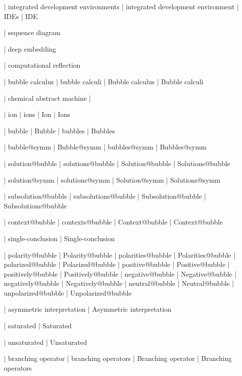 
 | integrated development environments
 | integrated development environment
 | IDEs
 | IDE

 | sequence diagram

 | deep embedding

 | computational reflection


 | bubble calculus
 | bubble calculi
 | Bubble calculus
 | Bubble calculi

 | chemical abstract machine
 | \cham
 
 | ion
 | ions
 | Ion
 | Ions

 | bubble
 | Bubble
 | bubbles
 | Bubbles

 | bubble@symm
 | Bubble@symm
 | bubbles@symm
 | Bubbles@symm

 | solution@bubble
 | solutions@bubble
 | Solution@bubble
 | Solutions@bubble

 | solution@symm
 | solutions@symm
 | Solution@symm
 | Solutions@symm

 | subsolution@bubble
 | subsolutions@bubble
 | Subsolution@bubble
 | Subsolutions@bubble

 | context@bubble
 | contexts@bubble
 | Context@bubble
 | Context@bubble

 | single-conclusion
 | Single-conclusion

 | polarity@bubble
 | Polarity@bubble
 | polarities@bubble
 | Polarities@bubble
 | polarized@bubble
 | Polarized@bubble
 | positive@bubble
 | Positive@bubble
 | positively@bubble
 | Positively@bubble
 | negative@bubble
 | Negative@bubble
 | negatively@bubble
 | Negatively@bubble
 | neutral@bubble
 | Neutral@bubble
 | unpolarized@bubble
 | Unpolarized@bubble

 | asymmetric interpretation
 | Asymmetric interpretation

 | saturated
 | Saturated

 | unsaturated
 | Unsaturated

 | branching operator
 | branching operators
 | Branching operator
 | Branching operators

